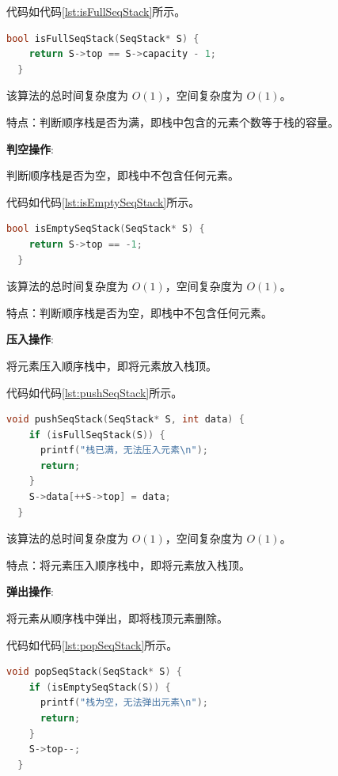 \documentclass[lang=cn,newtx,10pt,scheme=chinese]{elegantbook}
\begin{document}
代码如代码\ref{lst:isFullSeqStack}所示。

\begin{lstlisting}[language=C++, caption={判断顺序栈是否为满示例代码}, label={lst:isFullSeqStack}]
  bool isFullSeqStack(SeqStack* S) {
    return S->top == S->capacity - 1;
  }

\end{lstlisting}

该算法的总时间复杂度为 $O(1)$，空间复杂度为 $O(1)$。

特点：判断顺序栈是否为满，即栈中包含的元素个数等于栈的容量。

\textbf{判空操作}:

判断顺序栈是否为空，即栈中不包含任何元素。

代码如代码\ref{lst:isEmptySeqStack}所示。

\begin{lstlisting}[language=C++, caption={判断顺序栈是否为空示例代码}, label={lst:isEmptySeqStack}]
  bool isEmptySeqStack(SeqStack* S) {
    return S->top == -1;
  }

\end{lstlisting}

该算法的总时间复杂度为 $O(1)$，空间复杂度为 $O(1)$。

特点：判断顺序栈是否为空，即栈中不包含任何元素。

\textbf{压入操作}:

将元素压入顺序栈中，即将元素放入栈顶。

代码如代码\ref{lst:pushSeqStack}所示。

\begin{lstlisting}[language=C++, caption={压入顺序栈示例代码}, label={lst:pushSeqStack}]
  void pushSeqStack(SeqStack* S, int data) {
    if (isFullSeqStack(S)) {
      printf("栈已满，无法压入元素\n");
      return;
    }
    S->data[++S->top] = data;
  }

\end{lstlisting}

该算法的总时间复杂度为 $O(1)$，空间复杂度为 $O(1)$。

特点：将元素压入顺序栈中，即将元素放入栈顶。

\textbf{弹出操作}:

将元素从顺序栈中弹出，即将栈顶元素删除。

代码如代码\ref{lst:popSeqStack}所示。

\begin{lstlisting}[language=C++, caption={弹出顺序栈示例代码}, label={lst:popSeqStack}]
  void popSeqStack(SeqStack* S) {
    if (isEmptySeqStack(S)) {
      printf("栈为空，无法弹出元素\n");
      return;
    }
    S->top--;
  }

\end{lstlisting}
\end{document}
